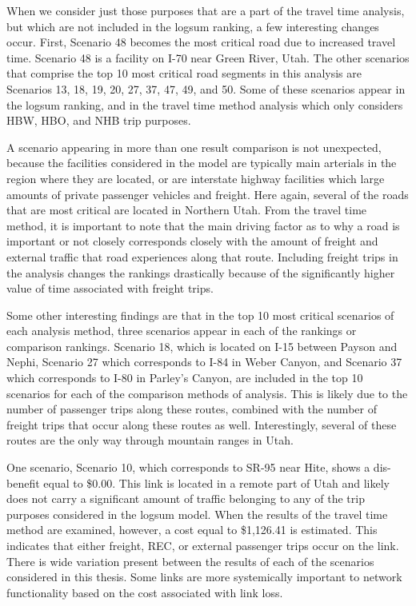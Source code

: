 When we consider just those purposes that are a part of the travel time analysis,
but which are not included in the logsum ranking, a few interesting changes occur.
First, Scenario 48 becomes the most critical road due to increased travel time.
Scenario 48 is a facility on I-70 near Green River, Utah.
The other scenarios that comprise the top 10 most critical road segments
in this analysis are Scenarios 13, 18, 19, 20, 27, 37, 47, 49, and 50. Some
of these scenarios appear in the logsum ranking, and in the travel time method
analysis which only considers HBW, HBO, and NHB trip purposes.

A scenario appearing in more than one result comparison is not unexpected,
because the facilities considered in the model are typically main
arterials in the region where they are located, or are interstate highway
facilities which large amounts of private passenger vehicles and freight.
Here again, several of the roads that are most critical are located in
Northern Utah. From the travel time method, it is important to note that the main driving factor as to
why a road is important or not closely corresponds closely with
the amount of
freight and external traffic that road experiences along that route. Including freight
trips in the analysis changes the rankings
drastically because of the significantly higher value of time associated
with freight trips.

Some other interesting findings are that in the top 10 most critical scenarios of each analysis
method, three scenarios appear in each of the rankings or comparison rankings. Scenario 18, which is located on
I-15 between Payson and Nephi, Scenario 27 which corresponds to I-84 in Weber
Canyon, and Scenario 37 which corresponds to I-80 in Parley’s Canyon,
are included in the
top 10 scenarios for each of the comparison methods of analysis. This is likely due to the
number of passenger trips along these routes, combined with the number of freight
trips that occur along these routes as well. Interestingly, several of these routes are
the only way through mountain ranges in Utah.

One scenario, Scenario 10, which corresponds to SR-95 near Hite, shows a
dis-benefit equal to \$0.00. This link is located in a remote part of Utah and likely
does not carry a significant amount of traffic belonging to any of the trip purposes
considered in the logsum model. When the results of the travel time method are examined,
however, a cost equal to \$1,126.41 is estimated. This indicates that either freight,
REC, or external passenger trips occur on the link. There is wide variation present between
the results of each of the scenarios considered in this thesis. Some links are more
systemically important to network functionality based on the cost associated with
link loss.

